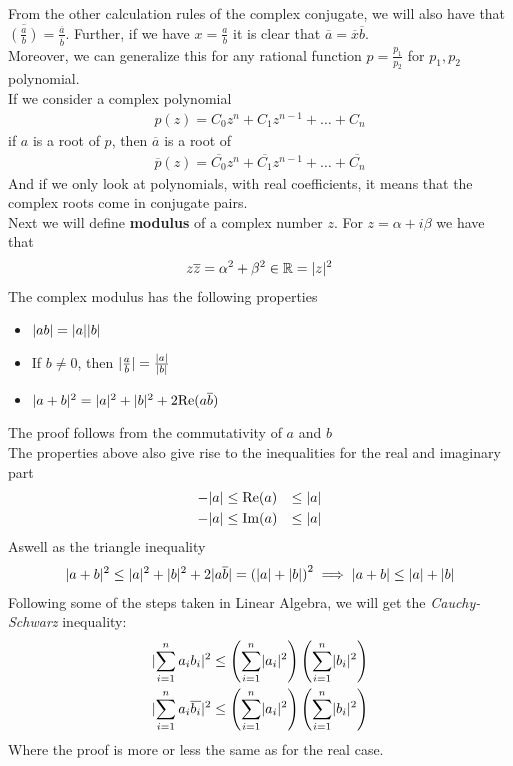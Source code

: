 From the other calculation rules of the complex conjugate, we will also have that $ \overline{ \left(\frac{a}{b}\right)} = \frac{\overline{a}}{\overline{b}}$. Further, if we have $x = \frac{a}{b}$ it is clear that $\overline{a} = \overline{x} \overline{b}$.\\
Moreover, we can generalize this for any rational function $p = \frac{p_1}{p_2}$ for $p_1, p_2$ polynomial.\\

If we consider a complex polynomial
\begin{align*}
				p(z) = C_0 z^n + C_1z^{n-1} + \ldots + C_n 
\end{align*}
if $a$ is a root of $p$, then $\overline{a}$ is a root of
\begin{align*}
				\overline{p}(z) = \overline{C_0}z^n + \overline{C_1}z^{n-1} + \ldots + \overline{C_n}
\end{align*}
And if we only look at polynomials, with real coefficients, it means that the complex roots come in conjugate pairs.\\
Next we will define \textbf{modulus} of a complex number $z$. For $z = \alpha + i \beta$ we have that
\begin{align*}
				z \overline{z} = \alpha^{2} + \beta^2 \in \mathbb{R} = \vert z\vert^2
\end{align*}
The complex modulus has the following properties
\begin{itemize}
				\item $\vert ab\vert = \vert a\vert\vert b\vert$
				\item If $b \neq 0$, then $\vert\frac{a}{b}\vert = \frac{\vert a\vert}{\vert b\vert}$
				\item $\vert a + b\vert^2 = \vert a\vert^2 + \vert b\vert^2 + 2 \text{Re}(a \overline{b})$
\end{itemize}
The proof follows from the commutativity of $a$ and $b$\\

The properties above also give rise to the inequalities for the real and imaginary part
\begin{align*}
				- \vert a\vert & \leq \text{Re}(a) &\leq \vert a\vert\\
				-\vert a\vert &\leq \text{Im}(a) &\leq \vert a\vert
\end{align*}
Aswell as the triangle inequality
\begin{align*}
				\vert a + b\vert^2 \leq \vert a\vert^2 + \vert b\vert^2 + 2\vert a \overline{b}\vert = \left(\vert a\vert + \vert b\vert\right)^{2} \implies \vert a + b\vert \leq \vert a\vert + \vert b\vert
\end{align*}
Following some of the steps taken in Linear Algebra, we will get the \emph{Cauchy-Schwarz} inequality:
\begin{align*}
				\abs{\sum_{i = 1}^{n}a_ib_i}^2 \leq \left(\sum_{i = 1}^{n}\abs{a_i}^2\right) \left(\sum_{i = 1}^{n}\abs{b_i}^2\right)\\
				\abs{\sum_{i = 1}^{n}a_i \overline{b_i}}^2 \leq \left(\sum_{i = 1}^{n}\abs{a_i}^2\right) \left(\sum_{i = 1}^{n}\abs{b_i}^2\right)
\end{align*}
Where the proof is more or less the same as for the real case.\\


